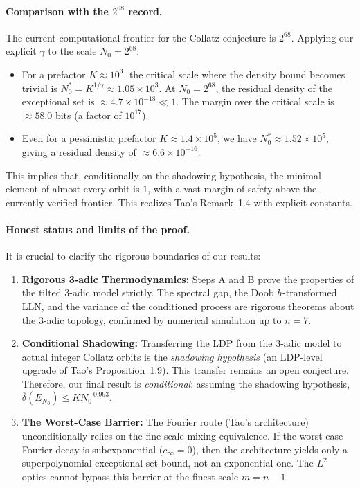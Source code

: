 \documentclass[12pt,a4paper]{article}
\begin{document}
\paragraph{Comparison with the $2^{68}$ record.}
The current computational frontier for the Collatz conjecture is $2^{68}$. Applying our explicit $\gamma$ to the scale $N_0 = 2^{68}$:
\begin{itemize}
\item For a prefactor $K \approx 10^3$, the critical scale where the density bound becomes trivial is $N_0^* = K^{1/\gamma} \approx 1.05 \times 10^3$. At $N_0 = 2^{68}$, the residual density of the exceptional set is $\approx 4.7 \times 10^{-18} \ll 1$. The margin over the critical scale is $\approx 58.0$ bits (a factor of $10^{17}$).
\item Even for a pessimistic prefactor $K \approx 1.4 \times 10^5$, we have $N_0^* \approx 1.52 \times 10^5$, giving a residual density of $\approx 6.6 \times 10^{-16}$.
\end{itemize}
This implies that, conditionally on the shadowing hypothesis, the minimal element of almost every orbit is $1$, with a vast margin of safety above the currently verified frontier. This realizes Tao's Remark~1.4 with explicit constants.

\paragraph{Honest status and limits of the proof.}
It is crucial to clarify the rigorous boundaries of our results:
\begin{enumerate}
\item \textbf{Rigorous 3-adic Thermodynamics:} Steps A and B prove the properties of the tilted 3-adic model strictly. The spectral gap, the Doob $h$-transformed LLN, and the variance of the conditioned process are rigorous theorems about the 3-adic topology, confirmed by numerical simulation up to $n=7$.
\item \textbf{Conditional Shadowing:} Transferring the LDP from the 3-adic model to actual integer Collatz orbits is the \emph{shadowing hypothesis} (an LDP-level upgrade of Tao's Proposition~1.9). This transfer remains an open conjecture. Therefore, our final result is \emph{conditional}: assuming the shadowing hypothesis, $\overline\delta(E_{N_0}) \le K N_0^{-0.993}$.
\item \textbf{The Worst-Case Barrier:} The Fourier route (Tao's architecture) unconditionally relies on the fine-scale mixing equivalence. If the worst-case Fourier decay is subexponential ($c_\infty = 0$), then the architecture yields only a superpolynomial exceptional-set bound, not an exponential one. The $L^2$ optics cannot bypass this barrier at the finest scale $m=n-1$.
\end{enumerate}
\end{document}
